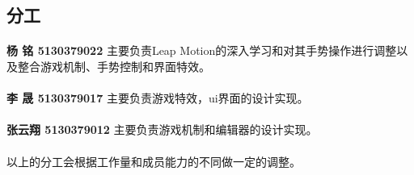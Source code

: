 \documentclass{article}
\begin{document}
\subsection{分工}
\paragraph{}
\textbf{杨 铭 5130379022}
主要负责Leap Motion的深入学习和对其手势操作进行调整以及整合游戏机制、手势控制和界面特效。
\paragraph{}
\textbf{李 晟 5130379017}
主要负责游戏特效，ui界面的设计实现。
\paragraph{}
\textbf{张云翔 5130379012}
主要负责游戏机制和编辑器的设计实现。
\paragraph{}
以上的分工会根据工作量和成员能力的不同做一定的调整。
\end{document}
